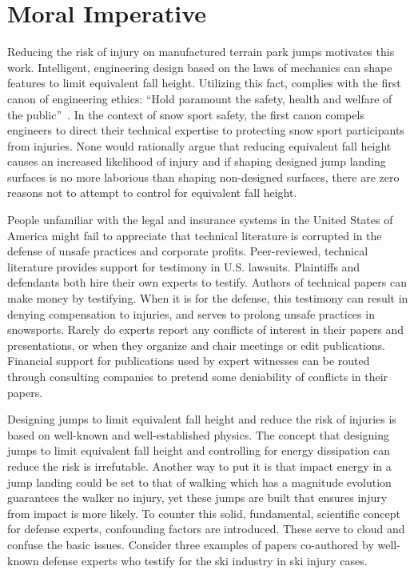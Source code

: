 \documentclass{article}
\begin{document}
\section{Moral Imperative}
%
Reducing the risk of injury on manufactured terrain park jumps motivates this
work. Intelligent, engineering design based on the laws of mechanics can shape
features to limit equivalent fall height. Utilizing this fact, complies with
the first canon of engineering ethics: ``Hold paramount the safety, health and
welfare of the public''~\cite{NSPE2019}. In the context of snow sport safety,
the first canon compels engineers to direct their technical expertise to
protecting snow sport participants from injuries. None would rationally argue
that reducing equivalent fall height causes an increased likelihood of
injury and if shaping designed jump landing surfaces is no more laborious than
shaping non-designed surfaces, there are zero reasons not to attempt to control
for equivalent fall height.

People unfamiliar with the legal and insurance systems in the United States of
America might fail to appreciate that technical literature is corrupted in the
defense of unsafe practices and corporate profits. Peer-reviewed, technical
literature provides support for testimony in U.S. lawsuits. Plaintiffs and
defendants both hire their own experts to testify. Authors of technical papers
can make money by testifying. When it is for the defense, this testimony can
result in denying compensation to injuries, and serves to prolong unsafe
practices in snowsports. Rarely do experts report any conflicts of interest in
their papers and presentations, or when they organize and chair meetings or
edit publications. Financial support for publications used by expert witnesses
can be routed through consulting companies to pretend some deniability of
conflicts in their papers.

Designing jumps to limit equivalent fall height and reduce the risk of injuries
is based on well-known and well-established physics. The concept that designing
jumps to limit equivalent fall height and controlling for energy dissipation
can reduce the risk is irrefutable. Another way to put it is that impact energy
in a jump landing could be set to that of walking which has a magnitude
evolution guarantees the walker no injury, yet these jumps are built that
ensures injury from impact is more likely. To counter this solid, fundamental,
scientific concept for defense experts, confounding factors are introduced.
These serve to cloud and confuse the basic issues. Consider three examples of
papers co-authored by well-known defense experts who testify for the ski
industry in ski injury cases.
\end{document}
